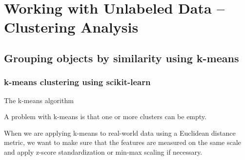 \chapter{Working with Unlabeled Data – Clustering Analysis\label{Ch01}}
\section{Grouping objects by similarity using k-means}
\subsection{k-means clustering using scikit-learn}
\begin{algorithm}
    \caption{The k-means algorithm}
\end{algorithm}

A problem with k-means is that one or more clusters can be empty.
\begin{tcolorbox}[title=Feature scaling]
    When we are applying k-means to real-world data using a Euclidean distance metric, we want to make sure that the features are measured on the same scale and apply z-score standardization or min-max scaling if necessary.
\end{tcolorbox}
